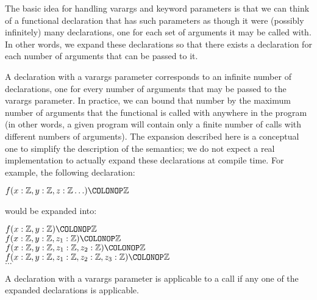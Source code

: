 The basic idea for handling varargs and keyword
parameters is that we
can think of a functional declaration that has such parameters as
though it were (possibly infinitely) many declarations, one for each
set of arguments it may be called with.  In other words, we expand
these declarations so that there exists a declaration for each number
of arguments that can be passed to it.


A declaration with a varargs parameter corresponds to an infinite
number of declarations, one for every number of arguments that may be
passed to the varargs parameter.  In practice, we can bound that
number by the maximum number of arguments that the functional is
called with anywhere in the program (in other words, a given program
will contain only a finite number of calls with different numbers of
arguments).  The expansion described here is a conceptual one to
simplify the description of the semantics; we do not expect a real
implementation to actually expand these declarations at compile time.
%
For example, the following declaration:
\begin{Fortress}
\(f(x \mathrel{\mathtt{:}} \mathbb{Z}, y \mathrel{\mathtt{:}} \mathbb{Z}, z \mathrel{\mathtt{:}} \mathbb{Z}\ldots)\COLONOP\mathbb{Z}\)
\end{Fortress}
would be expanded into:
\begin{Fortress}
\(f(x \mathrel{\mathtt{:}} \mathbb{Z}, y \mathrel{\mathtt{:}} \mathbb{Z})\COLONOP\mathbb{Z}\)\\
\(f(x \mathrel{\mathtt{:}} \mathbb{Z}, y \mathrel{\mathtt{:}} \mathbb{Z}, z_{1} \mathrel{\mathtt{:}} \mathbb{Z})\COLONOP\mathbb{Z}\)\\
\(f(x \mathrel{\mathtt{:}} \mathbb{Z}, y \mathrel{\mathtt{:}} \mathbb{Z}, z_{1} \mathrel{\mathtt{:}} \mathbb{Z}, z_{2} \mathrel{\mathtt{:}} \mathbb{Z})\COLONOP\mathbb{Z}\)\\
\(f(x \mathrel{\mathtt{:}} \mathbb{Z}, y \mathrel{\mathtt{:}} \mathbb{Z}, z_{1} \mathrel{\mathtt{:}} \mathbb{Z}, z_{2} \mathrel{\mathtt{:}} \mathbb{Z}, z_{3} \mathrel{\mathtt{:}} \mathbb{Z})\COLONOP\mathbb{Z}\)\\
\(\ldots\)
\end{Fortress}
A declaration with a varargs parameter is applicable to a call if
any one of the expanded declarations is applicable.



